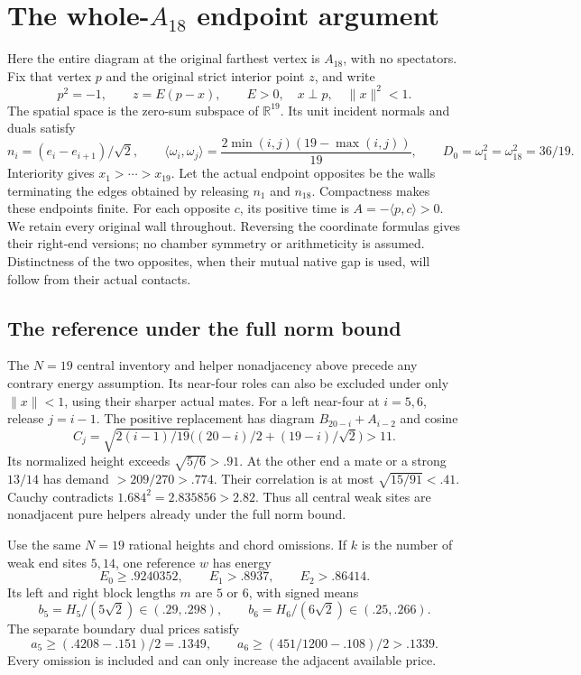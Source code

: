 \documentclass[11pt]{article}
\theoremstyle{definition}
\theoremstyle{remark}
\newcommand{\ip}[2]{\langle #1,#2\rangle}
\newcommand{\norm}[1]{\lVert #1\rVert}
\begin{document}
\section[The whole-A18 endpoint argument]{The whole-\(A_{18}\) endpoint argument}
\label{app:wholeA18}
Here the entire diagram at the original farthest vertex is
\(A_{18}\), with no spectators. Fix that vertex \(p\) and the
original strict interior point \(z\), and write
\[
 p^2=-1,\qquad z=E(p-x),\qquad E>0,\quad x\perp p,
 \quad \norm{x}^2<1.
\]
The spatial space is the zero-sum subspace of \(\mathbb R^{19}\).
Its unit incident normals and duals satisfy
\[
 n_i=(e_i-e_{i+1})/\sqrt2,\qquad
 \ip{\omega_i}{\omega_j}
   =\frac{2\min(i,j)(19-\max(i,j))}{19},\qquad
 D_0=\omega_1^2=\omega_{18}^2=36/19.
\]
Interiority gives \(x_1>\cdots>x_{19}\).
Let the actual endpoint opposites be the walls terminating the
edges obtained by releasing \(n_1\) and \(n_{18}\).
Compactness makes these endpoints finite. For each opposite \(c\),
its positive time is \(A=-\ip p c>0\).
We retain every original wall throughout. Reversing the coordinate
formulas gives their right-end versions; no chamber symmetry or
arithmeticity is assumed. Distinctness of the two opposites, when
their mutual native gap is used, will follow from their actual contacts.

\subsection{The reference under the full norm bound}
The \(N=19\) central inventory and helper nonadjacency
above precede any contrary energy assumption.
Its near-four roles can also be excluded under
only \(\norm x<1\), using their sharper actual mates.
For a left near-four at \(i=5,6\), release \(j=i-1\).
The positive replacement has diagram
\(B_{20-i}+A_{i-2}\) and cosine
\[
 C_j=\sqrt{2(i-1)/19}
     \bigl((20-i)/2+(19-i)/\sqrt2\bigr)>11.
\]
Its normalized height exceeds \(\sqrt{5/6}>.91\).
At the other end a mate or a strong \(13/14\)
has demand \(>209/270>.774\).
Their correlation is at most
\(\sqrt{15/91}<.41\).
Cauchy contradicts \(1.684^2=2.835856>2.82\).
Thus all central weak sites are nonadjacent pure
helpers already under the full norm bound.

Use the same \(N=19\) rational heights and chord
omissions. If \(k\) is the number of weak end
sites \(5,14\), one reference \(w\) has energy
\[
 E_0\geq.9240352,\qquad E_1>.8937,\qquad E_2>.86414.
\]
Its left and right block lengths \(m\) are \(5\)
or \(6\), with signed means
\[
 b_5=H_5/(5\sqrt2)\in(.29,.298),\qquad
 b_6=H_6/(6\sqrt2)\in(.25,.266).
\]
The separate boundary dual prices satisfy
\[
 a_5\geq(.4208-.151)/2=.1349,\qquad
 a_6\geq(451/1200-.108)/2>.1339.
\]
Every omission is included and can only increase
the adjacent available price.
\end{document}
